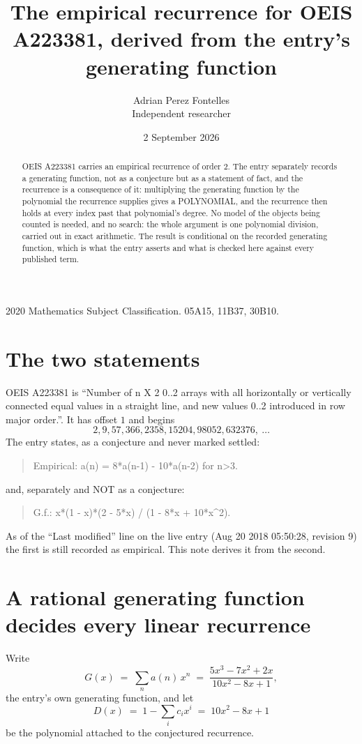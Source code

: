 \documentclass[11pt,a4paper]{article}
\title{The empirical recurrence for OEIS A223381, derived from the entry's generating function}
\author{Adrian Perez Fontelles\\ \small Independent researcher}
\date{2 September 2026}
\theoremstyle{plain}
\theoremstyle{definition}
\begin{document}
\maketitle

\begin{abstract}
OEIS A223381 carries an empirical recurrence of order $2$. The entry separately records a
generating function, not as a conjecture but as a statement of fact, and the recurrence is a
consequence of it: multiplying the generating function by the polynomial the recurrence
supplies gives a POLYNOMIAL, and the recurrence then holds at every index past that
polynomial's degree. No model of the objects being counted is needed, and no search: the
whole argument is one polynomial division, carried out in exact arithmetic. The result is
conditional on the recorded generating function, which is what the entry asserts and what is
checked here against every published term.
\end{abstract}

\noindent\small 2020 Mathematics Subject Classification. 05A15, 11B37, 30B10.\normalsize

\section{The two statements}

OEIS A223381 is ``Number of n X 2 0..2 arrays with all horizontally or vertically connected equal values in a straight line, and new values 0..2 introduced in row major order.''. It has offset $1$ and begins
\[
2, 9, 57, 366, 2358, 15204, 98052, 632376,\ \dots
\]
The entry states, as a conjecture and never marked settled:
\begin{quote}
Empirical: a(n) = 8*a(n-1) - 10*a(n-2) for n>3.
\end{quote}
and, separately and NOT as a conjecture:
\begin{quote}
G.f.: x*(1 - x)*(2 - 5*x) / (1 - 8*x + 10*x\^{}2).
\end{quote}
As of the ``Last modified'' line on the live entry (Aug 20 2018 05:50:28, revision 9) the first is still
recorded as empirical. This note derives it from the second.

\section{A rational generating function decides every linear recurrence}

Write
\[
G(x)\;=\;\sum_{n}a(n)\,x^{n}\;=\;\frac{5 x^{3} - 7 x^{2} + 2 x}{10 x^{2} - 8 x + 1},
\]
the entry's own generating function, and let
\[
D(x)\;=\;1-\sum_i c_i x^{i}\;=\;10 x^{2} - 8 x + 1
\]
be the polynomial attached to the conjectured recurrence.
\end{document}
